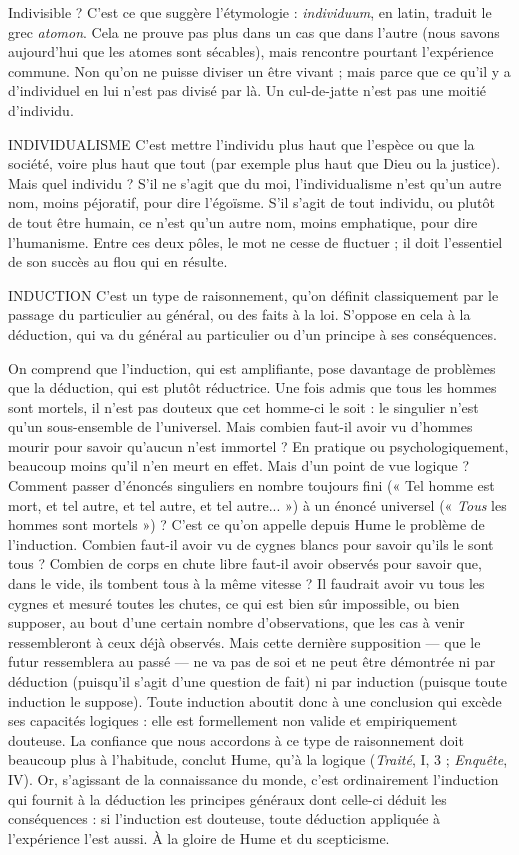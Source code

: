Indivisible ? C’est ce que suggère l’étymologie : {\it individuum}, en latin, traduit
le grec {\it atomon}. Cela ne prouve pas plus dans un cas que dans l’autre (nous
savons aujourd’hui que les atomes sont sécables), mais rencontre pourtant
l'expérience commune. Non qu’on ne puisse diviser un être vivant ; mais parce
que ce qu’il y a d’individuel en lui n’est pas divisé par là. Un cul-de-jatte n’est
pas une moitié d’individu.

INDIVIDUALISME C’est mettre l'individu plus haut que l’espèce ou que la
société, voire plus haut que tout (par exemple plus
haut que Dieu ou la justice). Mais quel individu ? S'il ne s’agit que du moi,
l’individualisme n’est qu’un autre nom, moins péjoratif, pour dire l’égoïsme.
S’il s’agit de tout individu, ou plutôt de tout être humain, ce n’est qu’un autre
nom, moins emphatique, pour dire l’humanisme. Entre ces deux pôles, le mot
ne cesse de fluctuer ; il doit l'essentiel de son succès au flou qui en résulte.

INDUCTION C'est un type de raisonnement, qu’on définit classiquement
par le passage du particulier au général, ou des faits à la loi.
S’oppose en cela à la déduction, qui va du général au particulier ou d’un principe
à ses conséquences.

On comprend que l’induction, qui est amplifiante, pose davantage de problèmes
que la déduction, qui est plutôt réductrice. Une fois admis que tous les
hommes sont mortels, il n’est pas douteux que cet homme-ci le soit : le singulier
n’est qu’un sous-ensemble de l’universel. Mais combien faut-il avoir vu
d'hommes mourir pour savoir qu’aucun n’est immortel ? En pratique ou psychologiquement,
beaucoup moins qu’il n’en meurt en effet. Mais d’un point de
vue logique ? Comment passer d’énoncés singuliers en nombre toujours fini
(« Tel homme est mort, et tel autre, et tel autre, et tel autre... ») à un énoncé
universel (« {\it Tous} les hommes sont mortels ») ? C’est ce qu’on appelle depuis
Hume le problème de l’induction. Combien faut-il avoir vu de cygnes blancs
pour savoir qu'ils le sont tous ? Combien de corps en chute libre faut-il avoir
observés pour savoir que, dans le vide, ils tombent tous à la même vitesse ? Il
faudrait avoir vu tous les cygnes et mesuré toutes les chutes, ce qui est bien sûr
impossible, ou bien supposer, au bout d’une certain nombre d’observations,
que les cas à venir ressembleront à ceux déjà observés. Mais cette dernière supposition
— que le futur ressemblera au passé — ne va pas de soi et ne peut être
démontrée ni par déduction (puisqu'il s’agit d’une question de fait) ni par
induction (puisque toute induction le suppose). Toute induction aboutit donc
à une conclusion qui excède ses capacités logiques : elle est formellement non
valide et empiriquement douteuse. La confiance que nous accordons à ce type
de raisonnement doit beaucoup plus à l’habitude, conclut Hume, qu’à la
logique ({\it Traité}, I, 3 ; {\it Enquête}, IV). Or, s'agissant de la connaissance du monde,
c’est ordinairement l'induction qui fournit à la déduction les principes généraux
dont celle-ci déduit les conséquences : si l'induction est douteuse, toute
déduction appliquée à l’expérience l’est aussi. À la gloire de Hume et du scepticisme.

